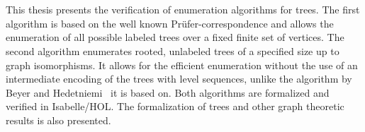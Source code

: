 \chapter{\abstractname}

This thesis presents the verification of enumeration algorithms for trees.
The first algorithm is based on the well known Prüfer-correspondence and allows the enumeration of all possible labeled trees over a fixed finite set of vertices.
The second algorithm enumerates rooted, unlabeled trees of a specified size up to graph isomorphisms.
It allows for the efficient enumeration without the use of an intermediate encoding of the trees with level sequences, unlike the algorithm by Beyer and Hedetniemi~\cite{beyer} it is based on.
Both algorithms are formalized and verified in Isabelle/HOL.
The formalization of trees and other graph theoretic results is also presented.